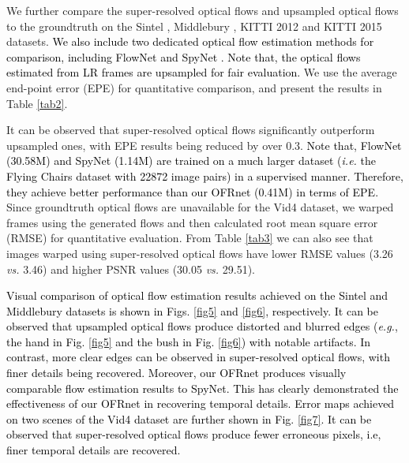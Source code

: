 \documentclass[journal]{IEEEtran}
\begin{document}
\begin{table*}[htp]
	We further compare the super-resolved optical flows and upsampled optical flows to the groundtruth on the Sintel \cite{2012-ANaturalisticOpenSourceMovieforOpticalFlowEvaluation-Butler-611-625}, Middlebury \cite{2011-ADatabaseandEvaluationMethodologyforOpticalFlow-Baker-1-31}, KITTI 2012 \cite{2012-AreWeReadyforAutonomousDriving?theKITTIVisionBenchmarkSuite-Geiger-3354-3361} and KITTI 2015 \cite{2015-ObjectSceneFlowforAutonomousVehicles-Menze-3061-3070} datasets. \textcolor{black}{We also include two dedicated optical flow estimation methods for comparison, including FlowNet \cite{2015-FlowNet:LearningOpticalFlowwithConvolutionalNetworks-Dosovitskiy-2758-2766} and SpyNet \cite{2017-OpticalFlowEstimationUsingaSpatialPyramidNetwork-Ranjan-2720-2729}. Note that, the optical flows estimated from LR frames are upsampled for fair evaluation.}
	We use the average end-point error (EPE) for quantitative comparison, and present the results in Table \ref{tab2}. 
	
	It can be observed that super-resolved optical flows significantly outperform upsampled ones, with EPE results being reduced by over 0.3. 
	\textcolor{black}{Note that, FlowNet (30.58M) and SpyNet (1.14M) are trained on a much larger dataset (\emph{i.e.} the Flying Chairs dataset with 22872 image pairs) in a supervised manner. Therefore, they achieve better performance than our OFRnet (0.41M) in terms of EPE.}
	Since  groundtruth optical flows are unavailable for the Vid4 dataset, we warped frames using the generated flows and then calculated root mean square error (RMSE) for quantitative evaluation. From Table \ref{tab3} we can also see that images warped using super-resolved optical flows have lower RMSE values (3.26 \emph{vs.} 3.46) and higher PSNR values (30.05 \emph{vs.} 29.51).
		
	
	\textcolor{black}{Visual comparison of optical flow estimation results achieved on the Sintel and Middlebury datasets is shown in Figs. \ref{fig5} and \ref{fig6}, respectively. It can be observed that upsampled optical flows produce distorted and blurred edges (\emph{e.g.}, the hand in Fig. \ref{fig5} and the bush in Fig. \ref{fig6})  with notable artifacts. In contrast, more clear edges can be observed in super-resolved optical flows, with finer details being recovered. \textcolor{black}{Moreover, our OFRnet produces visually comparable flow estimation results to SpyNet. This has clearly demonstrated the effectiveness of our OFRnet in recovering temporal details.}
	Error maps achieved on two scenes of the Vid4 dataset are further shown in Fig. \ref{fig7}. It can be observed that super-resolved optical flows produce fewer erroneous pixels, i.e, finer temporal details are recovered. }
	

\end{table*}
\end{document}
